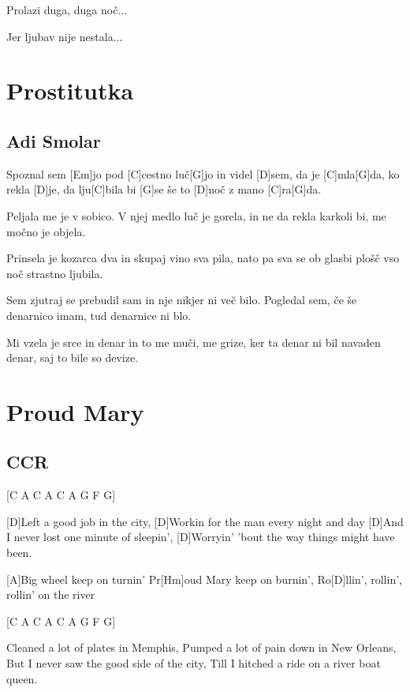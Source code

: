 \documentclass[a4paper,12pt]{article}
\begin{document}
\begin{multicols}{2}
\begin{guitar}
    
Prolazi duga, duga noč...
    

Jer ljubav nije nestala...

\end{guitar}
\section{Prostitutka}
\subsection*{Adi Smolar}
\begin{guitar}
[G]

Spoznal sem [Em]jo pod [C]cestno luč[G]jo in
videl [D]sem, da je [C]mla[G]da, ko rekla [D]je,
da lju[C]bila bi [G]se še to [D]noč z mano [C]ra[G]da.


Peljala me je v sobico. V njej medlo
luč je gorela, in ne da rekla karkoli
bi, me močno je objela.


Prinsela je kozarca dva in skupaj
vino sva pila, nato pa sva se ob
glasbi plošč vso noč strastno ljubila.


Sem zjutraj se prebudil sam in nje
nikjer ni več bilo. Pogledal sem, če
še denarnico imam, tud denarnice
ni blo.


Mi vzela je srce in denar in to me
muči, me grize, ker ta denar ni bil
navaden denar, saj to bile so
devize.

\end{guitar}
\section{Proud Mary}
\subsection*{CCR}
\begin{guitar}

[C A C A C A G F G]


[D]Left a good job in the city, 
[D]Workin for the man every night and day 
[D]And I never lost one minute of sleepin', 
[D]Worryin' 'bout the way things might have been. 

      
[A]Big wheel keep on turnin'
Pr[Hm]oud Mary keep on burnin',
Ro[D]llin', rollin', rollin' on the river 


[C A C A C A G F G]

 
Cleaned a lot of plates in Memphis,  
Pumped a lot of pain down in New Orleans, 
But I never saw the good side of the city, 
Till I hitched a ride on a river boat queen. 



\end{guitar}
\end{multicols}
\end{document}
